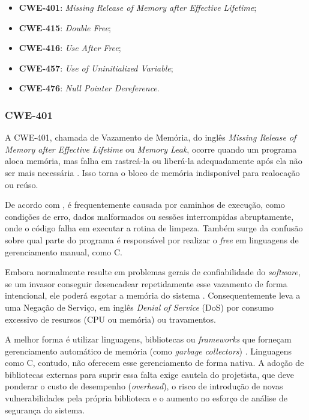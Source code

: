 \documentclass[
    12pt,                %
    openright,           %
    oneside,             %
    a4paper,             %
    english,             %
    brazil               %
]{abntex2}
\begin{document}
\begin{itemize}
  \item \textbf{CWE-401}: \textit{Missing Release of Memory after Effective Lifetime}; 
  \item \textbf{CWE-415}: \textit{Double Free}; 
  \item \textbf{CWE-416}: \textit{Use After Free}; 
  \item \textbf{CWE-457}: \textit{Use of Uninitialized Variable};
  \item \textbf{CWE-476}: \textit{Null Pointer Dereference}. 
\end{itemize}

\subsubsection{CWE-401}
\label{sec:401}
\par
A CWE-401, chamada de Vazamento de Memória, do inglês \textit{Missing Release of Memory after Effective Lifetime} ou \textit{Memory Leak}, ocorre quando um programa aloca memória, mas falha em rastreá-la ou liberá-la adequadamente após ela não ser mais necessária \cite{cwe401}. 
Isso torna o bloco de memória indisponível para realocação ou reúso.
\par
De acordo com , é frequentemente causada por caminhos de execução, como condições de erro, dados malformados ou sessões interrompidas abruptamente, onde o código falha em executar a rotina de limpeza.
Também surge da confusão sobre qual parte do programa é responsável por realizar o \textit{free} em linguagens de gerenciamento manual, como C.
\par
Embora normalmente resulte em problemas gerais de confiabilidade do \textit{software}, se um invasor conseguir desencadear repetidamente esse vazamento de forma intencional, ele poderá esgotar a memória do sistema \cite{cwe401}.
Consequentemente leva a uma Negação de Serviço, em inglês \textit{Denial of Service} (DoS) por consumo excessivo de resursos (CPU ou memória) ou travamentos.
\par
A melhor forma é utilizar linguagens, bibliotecas ou \textit{frameworks} que forneçam gerenciamento automático de memória (como \textit{garbage collectors}) \cite{cwe401}.
Linguagens como C, contudo, não oferecem esse gerenciamento de forma nativa.
A adoção de bibliotecas externas para suprir essa falta exige cautela do projetista, que deve ponderar o custo de desempenho (\textit{overhead}), o risco de introdução de novas vulnerabilidades pela própria biblioteca e o aumento no esforço de análise de segurança do sistema.
\end{document}
